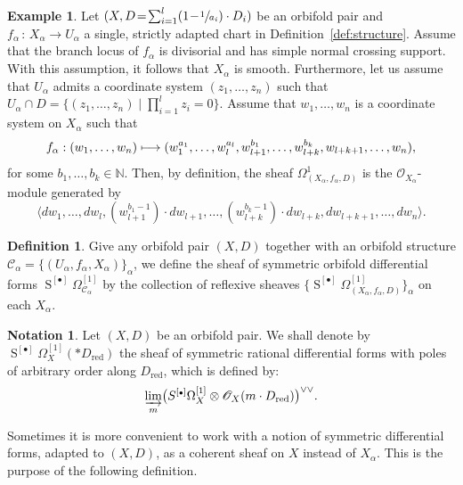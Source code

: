 \documentclass[JEP,XML,SOM,Unicode]{cedram}
\let\mathcal\mathscr
\let\scr\mathscr
\let\oldbullet\bullet
\newcommand{\sbullet}{{\scriptscriptstyle\oldbullet}}
\let\bullet\sbullet
\def\mto{\mathchoice{\longmapsto}{\mapsto}{\mapsto}{\mapsto}}
\theoremstyle{plain}
\theoremstyle{definition}
\newtheorem{definition}[theorem]{Definition}
\newtheorem{example}[theorem]{Example}
\newtheorem{notation}[theorem]{Notation}
\numberwithin{equation}{theorem}
\DeclareMathOperator{\red}{red}
\DeclareMathOperator{\Sym}{S}
\newcommand{\sO}{\scr{O}}
\begin{document}
\begin{example}\label{ex:OrbiCot}
Let $(X, D\!=\!\sum_{i=1}^l (1\!-\!\sfrac{1}{a_i})\cdot D_i)$ be an orbifold pair and \hbox{$f_{\alpha}\,{:}\,X_{\alpha}\!\to\!U_{\alpha}$}
a single, strictly adapted chart in Definition~\ref{def:structure}.
Assume that the branch locus of $f_{\alpha}$ is divisorial and has simple normal crossing support.
With this assumption, it follows that $X_{\alpha}$ is smooth.
Furthermore, let us assume that $U_{\alpha}$ admits a coordinate system $(z_1, \ldots, z_n)$
such that $U_{\alpha}\cap D = \{ (z_1, \ldots, z_n) \mid \prod_{i=1}^l z_i =0 \}$.
Assume that $w_1, \ldots , w_n$ is a coordinate system on $X_{\alpha}$ such that
\begin{equation} \label{expradaptedcover}
f_{\alpha}: (w_1, \ldots, w_n) \mto (w_1^{a_1} , \ldots, w_l^{a_l}, w_{l+1}^{b_1}, \ldots, w_{l+k}^{b_k},
w_{l+k+1}, \ldots, w_n),
\end{equation}
for some $b_1, \ldots, b_k \in \mathbb N$.
Then, by definition, the sheaf $\Omega^1_{(X_{\alpha}, f_{\alpha}, D )}$
is the $\sO_{X_{\alpha}}$-module generated by
$$
\bigl\langle dw_1 , \ldots, dw_l, (w^{b_1-1}_{l+1})\cdot dw_{l+1}, \ldots, (w^{b_k-1}_{l+k})\cdot dw_{l+k},
dw_{l+k+1}, \ldots, dw_n \bigr\rangle.
$$
\end{example}

\begin{definition}
Give any orbifold pair $(X,D)$ together with an orbifold structure
$\mathcal C_{\alpha} = \{ (U_{\alpha}, f_{\alpha}, X_{\alpha}) \}_{\alpha}$,
we define the sheaf of symmetric orbifold differential forms $\Sym^{[\bullet]} \Omega^{[1]}_{\mathcal C_{\alpha}}$
by the collection of reflexive sheaves $\{ \Sym^{[\bullet]} \Omega^{[1]}_{(X_{\alpha}, f_{\alpha}, D)} \}_{\alpha}$
on each $X_{\alpha}$.
\end{definition}

\begin{notation}
Let $(X,D)$ be an orbifold pair. We shall denote by $\Sym^{[\bullet]}\Omega^{[1]}_X(* D_{\red})$
the sheaf of symmetric rational differential forms with poles of arbitrary order along $D_{\red}$,
which is defined by:
$$
\varinjlim_{m} \bigl(S^{[\bullet]} \Omega_X^{[1]} \otimes \sO_X(m\cdot D_{\red}) \bigr)^{\vee\vee}.
$$
\end{notation}

Sometimes it is more convenient to work with a notion of symmetric differential forms,
adapted to $(X,D)$, as a coherent sheaf on $X$ instead of $X_{\alpha}$.
This is the purpose of the following definition.
\end{document}
